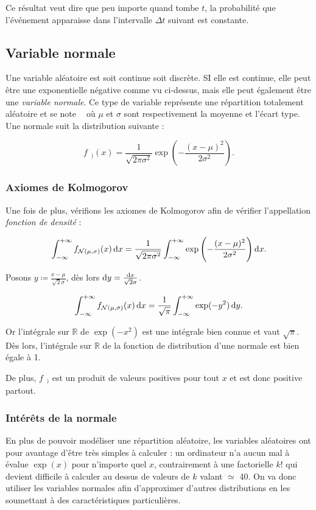 \documentclass{article}
\DeclareMathOperator{\Nms}{\mathcal N(\mu, \sigma)}
\begin{document}
			Ce résultat veut dire que peu importe quand tombe $t$, la probabilité que l'événement apparaisse dans l'intervalle $\Delta t$ suivant est constante.

	\subsection{Variable normale}
		Une variable aléatoire est soit continue soit discrète. SI elle est continue, elle peut être une exponentielle négative comme vu ci-dessus, mais elle peut également être
		une \textit{variable normale}. Ce type de variable représente une répartition totalement aléatoire et se note $\Nms$ où $\mu$ et $\sigma$ sont respectivement
		la moyenne et l'écart type. Une normale suit la distribution suivante :

		\[f_{\Nms)}(x) = \frac 1{\sqrt {2\pi\sigma^2}}\exp\left(-\frac {(x-\mu)^2}{2\sigma^2}\right).\]

		\subsubsection{Axiomes de Kolmogorov}
			Une fois de plus, vérifions les axiomes de Kolmogorov afin de vérifier l'appellation \textit{fonction de densité} :

			\[\int_{-\infty}^{+\infty}f_{\Nms}(x)\dif x = \frac 1{\sqrt {2\pi\sigma^2}}\int_{-\infty}^{+\infty}\exp\left(-\frac {(x-\mu)^2}{2\sigma^2}\right)\dif x.\]

			Posons $y \coloneqq\frac {x-\mu}{\sqrt 2\sigma}$, dès lors $\dif y = \frac {\dif x}{\sqrt 2 \sigma}$.

			\[\int_{-\infty}^{+\infty}f_{\Nms}(x)\dif x = \frac 1{\sqrt \pi}\int_{-\infty}^{+\infty}\exp(-y^2)\dif y.\]

			Or l'intégrale sur $\mathbb R$ de $\exp(-x^2)$ est une intégrale bien connue et vaut $\sqrt \pi$. Dès lors, l'intégrale sur $\mathbb R$ de la fonction de distribution
			d'une normale est bien égale à 1.

			De plus, $f_{\Nms)}$ est un produit de valeurs positives pour tout $x$ et est donc positive partout.

		\subsubsection{Intérêts de la normale $\Nms$}
			En plus de pouvoir modéliser une répartition aléatoire, les variables aléatoires ont pour avantage d'être très simples à calculer : un ordinateur n'a aucun mal à évalue $\exp(x)$
			pour n'importe quel $x$, contrairement à une factorielle $k!$ qui devient difficile à calculer au dessus de valeurs de $k$ valant $\simeq$ 40. On va donc utiliser les variables
			normales afin d'approximer d'autres distributions en les soumettant à des caractéristiques particulières.
\end{document}

